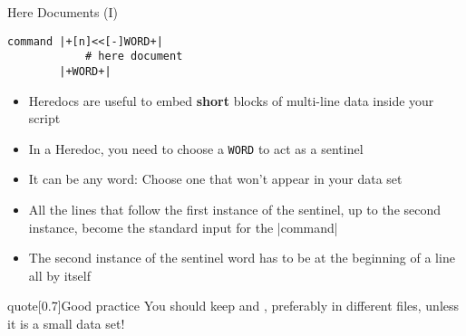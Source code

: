\begin{frame}[fragile]{Here Documents (I)}
    \vspace{-3mm}
    \begin{lstlisting}[style=MyBash, numbers=none]
        command |+[n]<<[-]WORD+|
            # here document
        |+WORD+|
    \end{lstlisting}
    \vspace{2mm}
    \begin{itemize}
        \item Heredocs are useful to embed \textbf{short} blocks of multi-line data inside your script\\[-0.5ex]
        \item In a Heredoc, you need to choose a \texttt{WORD} to act as a sentinel
        \item It can be any word: Choose one that won't appear in your data set
        \item All the lines that follow the first instance of the sentinel, up to the second instance, become the standard input for the \bash|command| 
        \item The second instance of the sentinel word has to be \alert{at the beginning of a line all by itself}
    \end{itemize}
    \begin{varblock}{quote}[0.7\textwidth]{Good practice}
        \textnormal{You should keep   and   , preferably in different files, unless it is a small data set!}
    \end{varblock}
\end{frame}
